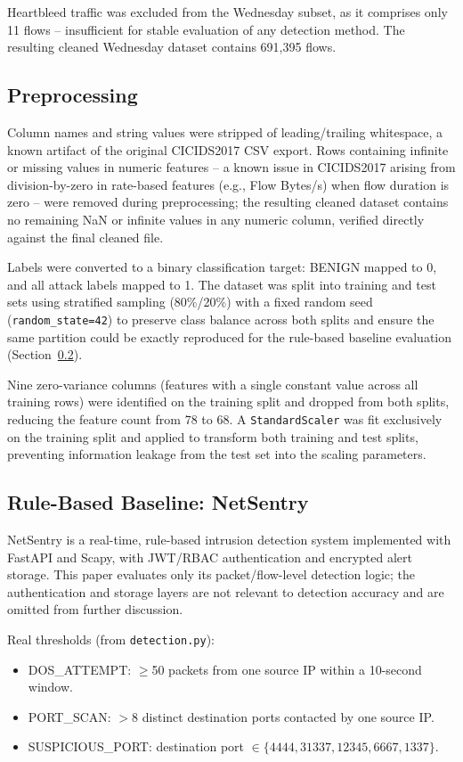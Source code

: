 \documentclass[conference]{IEEEtran}
\begin{document}
Heartbleed traffic was excluded from the Wednesday subset, as it comprises only 11 flows -- insufficient for stable evaluation of any detection method. The resulting cleaned Wednesday dataset contains 691,395 flows.
 
\subsection{Preprocessing}
Column names and string values were stripped of leading/trailing whitespace, a known artifact of the original CICIDS2017 CSV export. Rows containing infinite or missing values in numeric features -- a known issue in CICIDS2017 arising from division-by-zero in rate-based features (e.g., Flow Bytes/s) when flow duration is zero -- were removed during preprocessing; the resulting cleaned dataset contains no remaining NaN or infinite values in any numeric column, verified directly against the final cleaned file.
 
Labels were converted to a binary classification target: BENIGN mapped to 0, and all attack labels mapped to 1. The dataset was split into training and test sets using stratified sampling (80\%/20\%) with a fixed random seed (\texttt{random\_state=42}) to preserve class balance across both splits and ensure the same partition could be exactly reproduced for the rule-based baseline evaluation (Section~\ref{netsentry-baseline}).
 
Nine zero-variance columns (features with a single constant value across all training rows) were identified on the training split and dropped from both splits, reducing the feature count from 78 to 68. A \texttt{StandardScaler} was fit exclusively on the training split and applied to transform both training and test splits, preventing information leakage from the test set into the scaling parameters.
 
\subsection{Rule-Based Baseline: NetSentry}
\label{netsentry-baseline}
NetSentry is a real-time, rule-based intrusion detection system implemented with FastAPI and Scapy, with JWT/RBAC authentication and encrypted alert storage. This paper evaluates only its packet/flow-level detection logic; the authentication and storage layers are not relevant to detection accuracy and are omitted from further discussion.
 
Real thresholds (from \texttt{detection.py}):
\begin{itemize}
\item DOS\_ATTEMPT: $\geq$50 packets from one source IP within a 10-second window.
\item PORT\_SCAN: $>$8 distinct destination ports contacted by one source IP.
\item SUSPICIOUS\_PORT: destination port $\in \{4444, 31337, 12345, 6667, 1337\}$.
\end{itemize}
 
\end{document}
